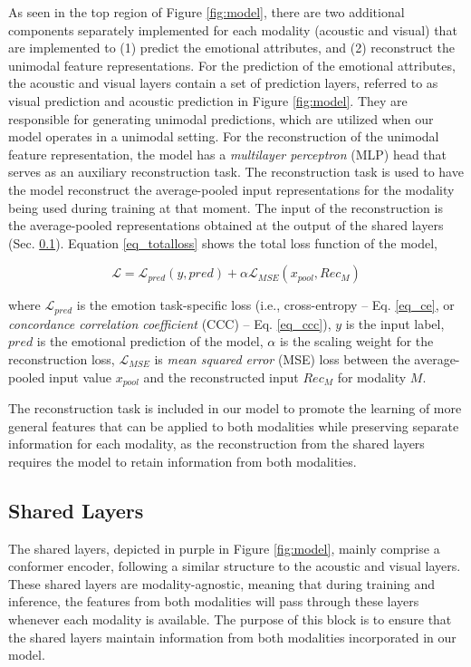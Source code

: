\documentclass{article}
\begin{document}
As seen in the top region of Figure \ref{fig:model}, there are two additional components separately implemented for each modality (acoustic and visual) that are implemented to (1) predict the emotional attributes, and (2) reconstruct the unimodal feature representations. For the prediction of the emotional attributes, the acoustic and visual layers contain a set of prediction layers, referred to as visual prediction and acoustic prediction in Figure \ref{fig:model}. They are responsible for generating unimodal predictions, which are utilized when our model operates in a unimodal setting. For the reconstruction of the unimodal feature representation, the model has a \emph{multilayer perceptron} (MLP) head that serves as an auxiliary reconstruction task. The reconstruction task is used to have the model reconstruct the average-pooled input representations for the modality being used during training at that moment. The input of the reconstruction is the average-pooled representations obtained at the output of the shared layers (Sec. \ref{ssec:SharedLayers}). Equation \ref{eq_totalloss} shows the total loss function of the model, 

 \begin{equation}\label{eq_totalloss}
    \mathcal{L}= \mathcal{L}_{pred}(y, pred) + \alpha\mathcal{L}_{MSE}(x_{pool}, Rec_M) 
 \end{equation}

\noindent
where $\mathcal{L}_{pred}$ is the emotion task-specific loss (i.e., cross-entropy -- Eq. \ref{eq_ce}, or \emph{concordance correlation coefficient} (CCC) -- Eq. \ref{eq_ccc}), $y$ is the input label, $pred$ is the emotional prediction of the model, $\alpha$ is the scaling weight for the reconstruction loss, $\mathcal{L}_{MSE}$ is \emph{mean squared error} (MSE) loss between the average-pooled input value $x_{pool}$ and the reconstructed input $Rec_M$ for modality $M$.

The reconstruction task is included in our model to promote the learning of more general features that can be applied to both modalities while preserving separate information for each modality, as the reconstruction from the shared layers requires the model to retain information from both modalities.


\subsection{Shared Layers}
\label{ssec:SharedLayers}

The shared layers, depicted in purple in Figure \ref{fig:model}, mainly comprise a conformer encoder, following a similar structure to the acoustic and visual layers. These shared layers are modality-agnostic, meaning that during training and inference, the features from both modalities will pass through these layers whenever each modality is available. The purpose of this block is to ensure that the shared layers maintain information from both modalities incorporated in our model.
\end{document}
